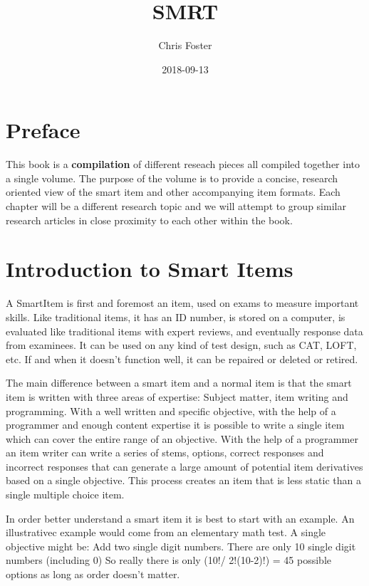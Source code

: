 \documentclass[]{book}
\title{SMRT}
\author{Chris Foster}
\date{2018-09-13}
\theoremstyle{definition}
\theoremstyle{definition}
\theoremstyle{definition}
\theoremstyle{remark}
\begin{document}
\maketitle

{
\setcounter{tocdepth}{1}
\tableofcontents
}
\chapter{Preface}\label{preface}

This book is a \textbf{compilation} of different reseach pieces all
compiled together into a single volume. The purpose of the volume is to
provide a concise, research oriented view of the smart item and other
accompanying item formats. Each chapter will be a different research
topic and we will attempt to group similar research articles in close
proximity to each other within the book.

\chapter{Introduction to Smart Items}\label{introduction-to-smart-items}

A SmartItem is first and foremost an item, used on exams to measure
important skills. Like traditional items, it has an ID number, is stored
on a computer, is evaluated like traditional items with expert reviews,
and eventually response data from examinees. It can be used on any kind
of test design, such as CAT, LOFT, etc. If and when it doesn't function
well, it can be repaired or deleted or retired.

The main difference between a smart item and a normal item is that the
smart item is written with three areas of expertise: Subject matter,
item writing and programming. With a well written and specific
objective, with the help of a programmer and enough content expertise it
is possible to write a single item which can cover the entire range of
an objective. With the help of a programmer an item writer can write a
series of stems, options, correct responses and incorrect responses that
can generate a large amount of potential item derivatives based on a
single objective. This process creates an item that is less static than
a single multiple choice item.

In order better understand a smart item it is best to start with an
example. An illustrativec example would come from an elementary math
test. A single objective might be: Add two single digit numbers. There
are only 10 single digit numbers (including 0) So really there is only
(10!/ 2!(10-2)!) = 45 possible options as long as order doesn't matter.
\end{document}
